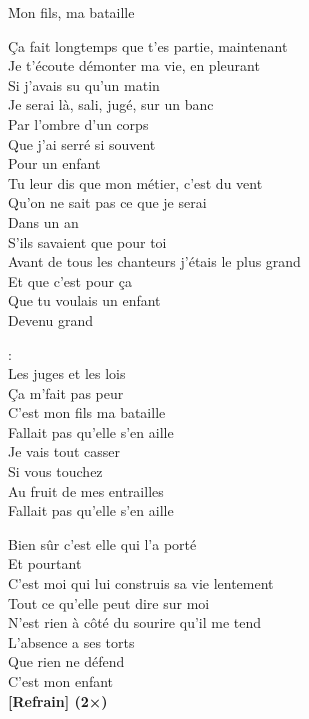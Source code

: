 \documentclass{novel}
\begin{document}
\newpage
\large

\h*{Mon fils, ma bataille}

\begin{multicols}{2}
Ça fait longtemps que t'es partie, maintenant\\
Je t'écoute démonter ma vie, en pleurant\\
Si j'avais su qu'un matin\\
Je serai là, sali, jugé, sur un banc\\
Par l'ombre d'un corps\\
Que j'ai serré si souvent\\
Pour un enfant\\

Tu leur dis que mon métier, c'est du vent\\
Qu'on ne sait pas ce que je serai\\
Dans un an\\
S'ils savaient que pour toi\\
Avant de tous les chanteurs j'étais le plus grand\\
Et que c'est pour ça\\
Que tu voulais un enfant\\
Devenu grand\\

\columnbreak
\begin{bfseries}
[Refrain]:\\
Les juges et les lois\\
Ça m'fait pas peur\\
C'est mon fils ma bataille\\
Fallait pas qu'elle s'en aille\\
Je vais tout casser\\
Si vous touchez\\
Au fruit de mes entrailles\\
Fallait pas qu'elle s'en aille\\
\end{bfseries}

Bien sûr c'est elle qui l'a porté\\
Et pourtant\\
C'est moi qui lui construis sa vie lentement\\
Tout ce qu'elle peut dire sur moi\\
N'est rien à côté du sourire qu'il me tend\\
L'absence a ses torts\\
Que rien ne défend\\
C'est mon enfant\\

\textbf{[Refrain] (2×)}
\end{multicols}
\end{document}
